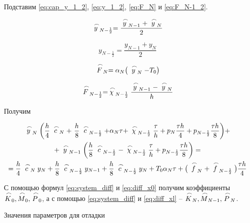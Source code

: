 Подставим \ref{eq:cap_y_1_2}, \ref{eq:y_1_2}, \ref{eq:F_N} и \ref{eq:F_N-1_2}.

\begin{equation}\label{eq:cap_y_1_2}
    \LittleCap{y}_{N-\frac{1}{2}} = \frac{\LittleCap{y}_{N-1} + \LittleCap{y}_N}{2}
\end{equation}

\begin{equation}\label{eq:y_1_2}
    y_{N-\frac{1}{2}} = \frac{y_{N-1} + y_N}{2}
\end{equation}

\begin{equation}\label{eq:F_N}
    \LittleCap{F}_N = \alpha_N \big( \LittleCap{y}_N - T_0 \big)
\end{equation}

\begin{equation}\label{eq:F_N-1_2}
    \LittleCap{F}_{N-\frac{1}{2}} = \LittleCap{\chi}_{N-\frac{1}{2}} \frac{\LittleCap{y}_{N-1} - \LittleCap{y}_N}{h}
\end{equation}

Получим

\begin{multline}\label{eq:diff_xl}
    \LittleCap{y}_N \bigg( \frac{h}{4} \LittleCap{c}_N +\ \frac{h}{8} \LittleCap{c}_{N-\frac{1}{2}} + \alpha_N \tau + \LittleCap{\chi}_{N-\frac{1}{2}} \frac{\tau}{h} + p_N \frac{\tau h}{4} + p_{N-\frac{1}{2}} \frac{\tau h}{8} \bigg) + \\
    + \LittleCap{y}_{N-1} \bigg( \frac{h}{8} \LittleCap{c}_{N-\frac{1}{2}} - \LittleCap{\chi}_{N-\frac{1}{2}} \frac{\tau}{h} + p_{N-\frac{1}{2}} \frac{\tau h}{8} \bigg) = \\
    = \frac{h}{4} \LittleCap{c}_N y_N + \frac{h}{8} \LittleCap{c}_{N-\frac{1}{2}} y_{N-1} + \frac{h}{8} \LittleCap{c}_{N-\frac{1}{2}} y_N + T_0 \alpha_N \tau + \big( \LittleCap{f}_N + \LittleCap{f}_{N-\frac{1}{2}} \big) \frac{\tau h}{4}
\end{multline}

С помощью формул \ref{eq:system_diff} и \ref{eq:diff_x0} получим коэффициенты $\LittleCap{K}_0, \LittleCap{M}_0, \LittleCap{P}_0$, а с помощью \ref{eq:system_diff} и \ref{eq:diff_xl} -- $\LittleCap{K}_N, \LittleCap{M}_{N-1}, \LittleCap{P}_N$.

Значения параметров для отладки


